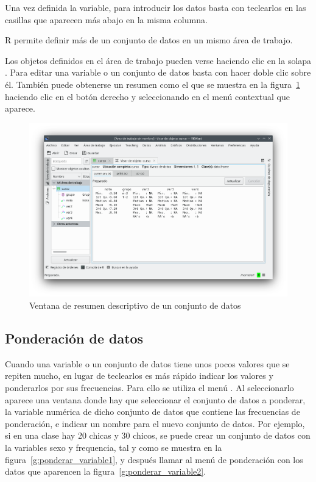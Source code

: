 Una vez definida la variable, para introducir los datos basta con teclearlos en las casillas que aparecen más abajo en
la misma columna.

R permite definir más de un conjunto de datos en un mismo área de trabajo.

Los objetos definidos en el área de trabajo pueden verse haciendo clic en la solapa .
Para editar una variable o un conjunto de datos basta con hacer doble clic sobre él.
También puede obtenerse un resumen como el que se muestra en la figura~\ref{g:resumen_datos} haciendo clic en el botón
derecho y seleccionando  en el menú contextual que aparece.

\begin{figure}[htp]
\begin{center}
  \includegraphics[width=\textwidth]{capitulos/introduccion/img/resumen_datos}
  \caption{Ventana de resumen descriptivo de un conjunto de datos}
  \label{g:resumen_datos}
\end{center}
\end{figure}

\subsection{Ponderación de datos}
Cuando una variable o un conjunto de datos tiene unos pocos valores que se repiten mucho, en lugar de teclearlos es más
rápido indicar los valores y ponderarlos por sus frecuencias.
Para ello se utiliza el menú .
Al seleccionarlo aparece una ventana donde hay que seleccionar el conjunto de datos a ponderar, la variable numérica de
dicho conjunto de datos que contiene las frecuencias de ponderación, e indicar un nombre para el nuevo conjunto de datos.
Por ejemplo, si en una clase hay 20 chicas y 30 chicos, se puede crear un conjunto de datos con la variables sexo y
frequencia, tal y como se muestra en la figura~\ref{g:ponderar_variable1}, y después llamar al menú de ponderación con
los datos que aparencen la figura~\ref{g:ponderar_variable2}.

